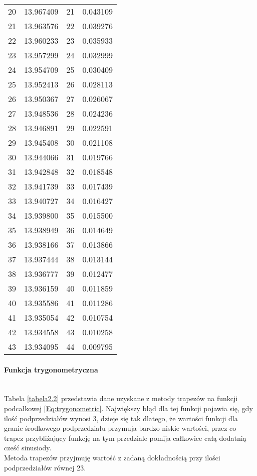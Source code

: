 \documentclass[12pt,twoside]{article}
\begin{document}
\begin{table}[ht]
\begin{tabular}{lrrr}
20 &      13.967409 &      21 &   0.043109 \\
21 &      13.963576 &      22 &   0.039276 \\
22 &      13.960233 &      23 &   0.035933 \\
23 &      13.957299 &      24 &   0.032999 \\
24 &      13.954709 &      25 &   0.030409 \\
25 &      13.952413 &      26 &   0.028113 \\
26 &      13.950367 &      27 &   0.026067 \\
27 &      13.948536 &      28 &   0.024236 \\
28 &      13.946891 &      29 &   0.022591 \\
29 &      13.945408 &      30 &   0.021108 \\
30 &      13.944066 &      31 &   0.019766 \\
31 &      13.942848 &      32 &   0.018548 \\
32 &      13.941739 &      33 &   0.017439 \\
33 &      13.940727 &      34 &   0.016427 \\
34 &      13.939800 &      35 &   0.015500 \\
35 &      13.938949 &      36 &   0.014649 \\
36 &      13.938166 &      37 &   0.013866 \\
37 &      13.937444 &      38 &   0.013144 \\
38 &      13.936777 &      39 &   0.012477 \\
39 &      13.936159 &      40 &   0.011859 \\
40 &      13.935586 &      41 &   0.011286 \\
41 &      13.935054 &      42 &   0.010754 \\
42 &      13.934558 &      43 &   0.010258 \\
43 &      13.934095 &      44 &   0.009795 \\
\bottomrule
\end{tabular}
\end{table}


\paragraph{Funkcja trygonometryczna}\mbox{} \\

Tabela \eqref{tabela2.2} przedstawia dane uzyskane z metody trapezów na funkcji podcałkowej \eqref{Eq:trygonometric}. Największy błąd dla tej funkcji pojawia się, gdy ilość podprzedziałów wynosi 3, dzieje się tak dlatego, że wartości funkcji dla granic środkowego podprzedziału przymuja bardzo niskie wartości, przez co trapez przybliżający funkcję na tym przedziale pomija całkowice całą dodatnią cześć sinusiody.\\
Metoda trapezów przyjmuję wartość z zadaną dokładnością przy ilości podprzedziałów równej 23.
\end{document}
